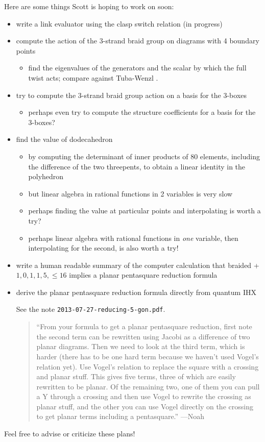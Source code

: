 \documentclass[12pt]{amsart}
\begin{document}
Here are some things Scott is hoping to work on soon:
\begin{itemize}
\item write a link evaluator using the clasp switch relation (in progress)
\item compute the action of the 3-strand braid group on diagrams with 4
boundary points
\begin{itemize}
\item find the eigenvalues of the generators and the scalar by which the full twist
acts; compare against Tuba-Wenzl \cite{MR1815266}.
\end{itemize}
\item try to compute the 3-strand braid group action on a basis for the 3-boxes
\begin{itemize}
\item perhaps even try to compute the structure coefficients for a basis for
the 3-boxes?
\end{itemize}
\item find the value of dodecahedron
\begin{itemize}
\item by computing the determinant of inner
products of 80 elements, including the difference of the two threepents, to
obtain a linear identity in the polyhedron
\item but linear algebra in
rational functions in 2 variables is very slow
\item perhaps finding the value at particular points and interpolating is worth
a try?
\item perhaps linear algebra with rational functions in \emph{one} variable,
then interpolating for the second, is also worth a try!
\end{itemize}
\item write a human readable summary of the computer calculation that braided +
$1,0,1,1,5,\leq16$ implies a planar pentasquare reduction formula
\item derive the planar pentasquare reduction formula directly from
  quantum IHX

  See the note \nolinkurl{2013-07-27-reducing-5-gon.pdf}.
\begin{quote}
``From your formula to get a planar pentasquare reduction, first note the second term can be rewritten using Jacobi as a difference of two planar diagrams.  Then we need to look at the third term, which is harder (there has to be one hard term because we haven't used Vogel's relation yet).  Use Vogel's relation to replace the square with a crossing and planar stuff.  This gives five terms,  three of which are easily rewritten to be planar.  Of the remaining two, one of them you can pull a Y through a crossing and then use Vogel to rewrite the crossing as planar stuff, and the other you can use Vogel directly on the crossing to get planar terms including a pentasquare.''
---Noah
\end{quote}
\end{itemize}
Feel free to advise or criticize these plans!
\end{document}
